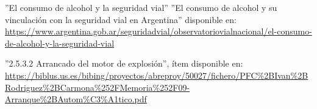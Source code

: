 \documentclass[a4paper,11pt]{article}
\begin{document}
\begin{multicols}{2}
\begin{thebibliography}{6}
				''El consumo de alcohol y la seguridad vial'' ''El consumo de alcohol y su vinculación con la seguridad vial en Argentina'' disponible en: \url{https://www.argentina.gob.ar/seguridadvial/observatoriovialnacional/el-consumo-de-alcohol-y-la-seguridad-vial}
				
				\begin{minipage}{\linewidth}
					\item[\textbf{[6]}]
					''2.5.3.2 Arrancado del motor de explosión'', ítem disponible en: \url{https://biblus.us.es/bibing/proyectos/abreproy/50027/fichero/PFC%2BIvan%2BRodriguez%2BCarmona%252FMemoria%252F09-Arranque%2BAutom%C3%A1tico.pdf}
				\end{minipage}		
									
			\end{thebibliography}
		
	\end{multicols}
	
\end{document}

